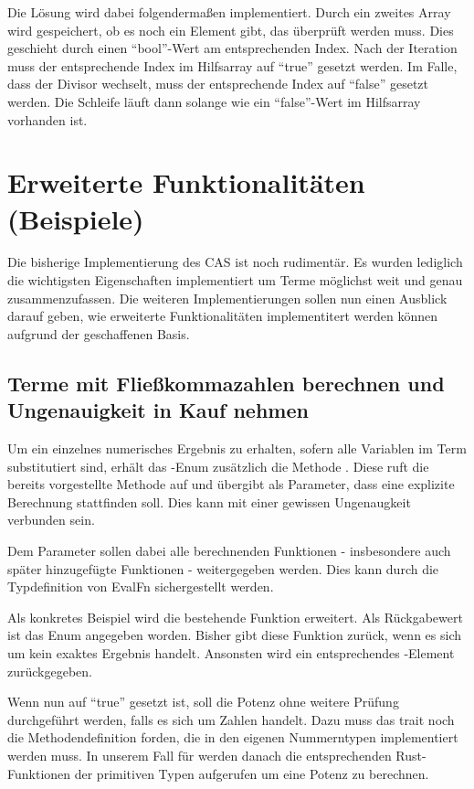 \documentclass[11pt,a4paper, ngerman]{article}
\begin{document}
Die Lösung wird dabei folgendermaßen implementiert. Durch ein zweites Array wird gespeichert, ob es noch ein Element gibt, das überprüft werden muss. Dies geschieht durch einen ``bool''-Wert am entsprechenden Index. Nach der Iteration muss der entsprechende Index im Hilfsarray auf ``true'' gesetzt werden. Im Falle, dass der Divisor wechselt, muss der entsprechende Index auf ``false'' gesetzt werden. Die Schleife läuft dann solange wie ein ``false''-Wert im Hilfsarray vorhanden ist.

\newpage

\section{Erweiterte Funktionalitäten (Beispiele)}
Die bisherige Implementierung des CAS ist noch rudimentär. Es wurden lediglich die wichtigsten Eigenschaften implementiert um Terme möglichst weit und genau zusammenzufassen.
Die weiteren Implementierungen sollen nun einen Ausblick darauf geben, wie erweiterte Funktionalitäten implementitert werden können aufgrund der geschaffenen Basis. 

\label{sec:ungenauigkeitenKapitel}
\subsection{Terme mit Fließkommazahlen berechnen und Ungenauigkeit in Kauf nehmen} Um ein einzelnes numerisches Ergebnis zu erhalten, sofern alle Variablen im Term substitutiert sind, erhält das -Enum zusätzlich die Methode . Diese ruft die bereits vorgestellte Methode  auf und übergibt als Parameter, dass eine explizite Berechnung stattfinden soll. Dies kann mit einer gewissen Ungenaugkeit verbunden sein.

Dem Parameter  sollen dabei alle berechnenden Funktionen - insbesondere auch später hinzugefügte Funktionen - weitergegeben werden. Dies kann durch die Typdefinition von EvalFn sichergestellt werden.

Als konkretes Beispiel wird die bestehende Funktion  erweitert. Als Rückgabewert ist das Enum  angegeben worden. Bisher gibt diese Funktion  zurück, wenn es sich um kein exaktes Ergebnis handelt. Ansonsten wird ein entsprechendes -Element zurückgegeben.

Wenn nun  auf ``true'' gesetzt ist, soll die Potenz ohne weitere Prüfung durchgeführt werden, falls es sich um Zahlen handelt. Dazu muss das trait  noch die Methodendefinition  forden, die in den eigenen Nummerntypen implementiert werden muss. In unserem Fall für  werden danach die entsprechenden Rust-Funktionen der primitiven Typen aufgerufen um eine Potenz zu berechnen.
\end{document}
